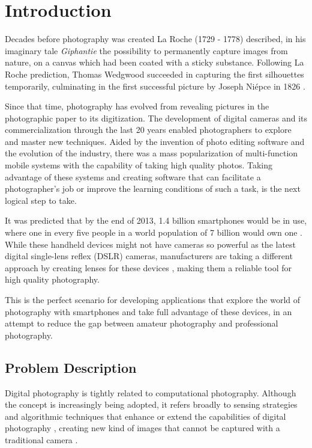 % 
%  
%
\chapter{Introduction}
\label{cha:intro}

Decades before photography was created La Roche (1729 - 1778) described, in his imaginary tale \emph{Giphantie} the possibility to permanently capture images from nature, on a canvas which had been coated with a sticky substance. Following La Roche prediction, Thomas Wedgwood succeeded in capturing the first silhouettes temporarily, culminating in the first successful picture by Joseph Niépce in 1826 \cite{lemagny1987history}. 

Since that time, photography has evolved from revealing pictures in the photographic paper to its digitization. The development of digital cameras and its commercialization through the last 20 years enabled photographers to explore and master new techniques.
Aided by the invention of photo editing software and the evolution of the industry, there was a mass popularization of multi-function mobile systems with the capability of taking high quality photos. 
Taking advantage of these systems and creating software that can facilitate a photographer's job or improve the learning conditions of such a task, is the next logical step to take.

It was predicted that by the end of 2013, 1.4 billion smartphones would be in use, where one in every five people in a world population of 7 billion would own one \cite{Leonard2013}. While these handheld devices might not have cameras so powerful as the latest digital single-lens reflex (DSLR) cameras, manufacturers are taking a different approach by creating lenses for these devices \cite{Bolton2013}, making them a reliable tool for high quality photography.

This is the perfect scenario for developing applications that explore the world of photography with smartphones and take full advantage of these devices, in an attempt to reduce the gap between amateur photography and professional photography.

\section{Problem Description}

Digital photography is tightly related to computational photography. Although the concept is increasingly being adopted, it refers broadly to sensing strategies and algorithmic techniques that enhance or extend the capabilities of digital photography \cite{szeliski2012technical} , creating new kind of images that cannot be captured with a traditional camera \cite{pulli2009mobile}. 

